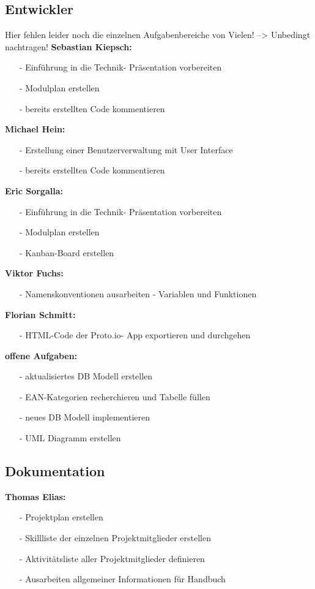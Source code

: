 \documentclass[12pt,a4paper]{article}
\begin{document}
\subsection{Entwickler}
 Hier fehlen leider noch die einzelnen Aufgabenbereiche von Vielen! --> Unbedingt nachtragen!
\newline
\newline
\textbf{Sebastian Kiepsch:}
\begin{itemize}
\item[-] Einführung in die Technik- Präsentation vorbereiten
\item[-]Modulplan erstellen
\item[-] bereits erstellten Code kommentieren
\end{itemize}
\textbf{Michael Hein:}
\begin{itemize}
\item[-]Erstellung einer Benutzerverwaltung mit User Interface
\item[-] bereits erstellten Code kommentieren
\end{itemize}
\textbf{Eric Sorgalla:}
\begin{itemize}
\item[-] Einführung in die Technik- Präsentation vorbereiten
\item[-] Modulplan erstellen
\item[-] Kanban-Board erstellen
\end{itemize}
\textbf{Viktor Fuchs:}
\begin{itemize}
\item[-] Namenskonventionen ausarbeiten - Variablen und Funktionen
\end{itemize}
\textbf{Florian Schmitt:}
\begin{itemize}
\item[-] HTML-Code der Proto.io- App exportieren und durchgehen
\end{itemize}
\textbf{offene Aufgaben:}
\begin{itemize}
\item[-] aktualisiertes DB Modell erstellen
\item[-] EAN-Kategorien recherchieren und Tabelle füllen
\item[-] neues DB Modell implementieren
\item[-] UML Diagramm erstellen
\end{itemize}

\newpage
\subsection{Dokumentation}
\textbf{Thomas Elias:}
\begin{itemize}
\item[-] Projektplan erstellen 
\item[-] Skillliste der einzelnen Projektmitglieder erstellen
\item[-] Aktivitätsliste aller Projektmitglieder definieren
\item[-] Ausarbeiten allgemeiner Informationen für Handbuch
\end{itemize}
\end{document}
